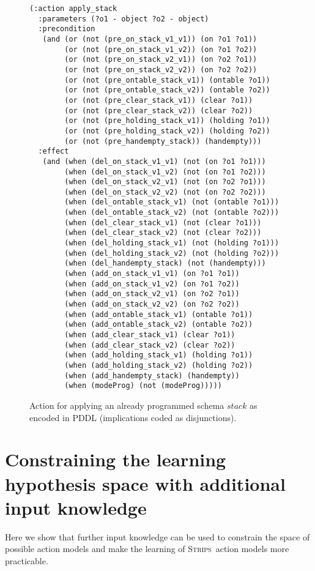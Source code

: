 \documentclass[letterpaper]{article} %
\newcommand{\strips}{\textsc{Strips}}     %
\begin{document}
\begin{figure}
\begin{scriptsize}
\begin{verbatim}
(:action apply_stack
  :parameters (?o1 - object ?o2 - object)
  :precondition
   (and (or (not (pre_on_stack_v1_v1)) (on ?o1 ?o1))
        (or (not (pre_on_stack_v1_v2)) (on ?o1 ?o2))
        (or (not (pre_on_stack_v2_v1)) (on ?o2 ?o1))
        (or (not (pre_on_stack_v2_v2)) (on ?o2 ?o2))
        (or (not (pre_ontable_stack_v1)) (ontable ?o1))
        (or (not (pre_ontable_stack_v2)) (ontable ?o2))
        (or (not (pre_clear_stack_v1)) (clear ?o1))
        (or (not (pre_clear_stack_v2)) (clear ?o2))
        (or (not (pre_holding_stack_v1)) (holding ?o1))
        (or (not (pre_holding_stack_v2)) (holding ?o2))
        (or (not (pre_handempty_stack)) (handempty)))
  :effect
   (and (when (del_on_stack_v1_v1) (not (on ?o1 ?o1)))
        (when (del_on_stack_v1_v2) (not (on ?o1 ?o2)))
        (when (del_on_stack_v2_v1) (not (on ?o2 ?o1)))
        (when (del_on_stack_v2_v2) (not (on ?o2 ?o2)))
        (when (del_ontable_stack_v1) (not (ontable ?o1)))
        (when (del_ontable_stack_v2) (not (ontable ?o2)))
        (when (del_clear_stack_v1) (not (clear ?o1)))
        (when (del_clear_stack_v2) (not (clear ?o2)))
        (when (del_holding_stack_v1) (not (holding ?o1)))
        (when (del_holding_stack_v2) (not (holding ?o2)))
        (when (del_handempty_stack) (not (handempty)))
        (when (add_on_stack_v1_v1) (on ?o1 ?o1))
        (when (add_on_stack_v1_v2) (on ?o1 ?o2))
        (when (add_on_stack_v2_v1) (on ?o2 ?o1))
        (when (add_on_stack_v2_v2) (on ?o2 ?o2))
        (when (add_ontable_stack_v1) (ontable ?o1))
        (when (add_ontable_stack_v2) (ontable ?o2))
        (when (add_clear_stack_v1) (clear ?o1))
        (when (add_clear_stack_v2) (clear ?o2))
        (when (add_holding_stack_v1) (holding ?o1))
        (when (add_holding_stack_v2) (holding ?o2))
        (when (add_handempty_stack) (handempty))
        (when (modeProg) (not (modeProg)))))
\end{verbatim}
\end{scriptsize}
 \caption{\small Action for applying an already programmed schema $stack$ as encoded in PDDL (implications coded as disjunctions).}
\label{fig:compilation}
\end{figure}

\section{Constraining the learning hypothesis space with additional input knowledge}
\label{sec:Constraining}
Here we show that further input knowledge can be used to constrain the space of possible action models and make the learning of \strips\ action models more practicable.
\end{document}
